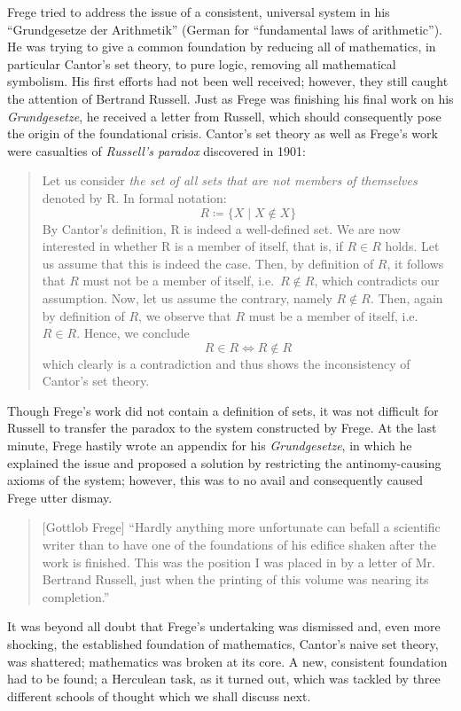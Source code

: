 \documentclass[hidelinks]{article}
\begin{document}
Frege tried to address the issue of a consistent, universal system in his ``Grundgesetze der Arithmetik'' (German for ``fundamental laws of arithmetic''). He was trying to give a common foundation by reducing all of mathematics, in particular Cantor's set theory, to pure logic, removing all mathematical symbolism. His first efforts had not been well received; however, they still caught the attention of Bertrand Russell. Just as Frege was finishing his final work on his \textit{Grundgesetze}, he received a letter from Russell, which should consequently pose the origin of the foundational crisis. Cantor's set theory as well as Frege's work were casualties of \textit{Russell's paradox} discovered in 1901:
\begin{quote}
Let us consider \textit{the set of all sets that are not members of themselves} denoted by R. In formal notation:
\begin{equation*}
	R\coloneqq\{X\mid X\notin X\}
\end{equation*}
By Cantor's definition, R is indeed a well-defined set.
We are now interested in whether R is a member of itself, that is, if $R\in R$ holds.
Let us assume that this is indeed the case. Then, by definition of $R$, it follows that $R$ must not be a member of itself, i.e.\ $R\notin R$, which contradicts our assumption. Now, let us assume the contrary, namely $R\notin R$. Then, again by definition of $R$, we observe that $R$ must be a member of itself, i.e.\ $R\in R$. Hence, we conclude
\begin{equation*}
		R\in R\iff R\notin R
\end{equation*}
which clearly is a contradiction and thus shows the inconsistency of Cantor's set theory.
\end{quote}
Though Frege's work did not contain a definition of sets, it was not difficult for Russell to transfer the paradox to the system constructed by Frege. At the last minute, Frege hastily wrote an appendix for his \textit{Grundgesetze}, in which he explained the issue and proposed a solution by restricting the antinomy-causing axioms of the system; however, this was to no avail and consequently caused Frege utter dismay.
\begin{quote}[Gottlob Frege]
``Hardly anything more unfortunate can befall a scientific writer than to have one of the foundations of his edifice shaken after the work is finished. This was the position I was placed in by a letter of Mr. Bertrand Russell, just when the printing of this volume was nearing its completion.''\cite{frege_appendix}
\end{quote}
It was beyond all doubt that Frege's undertaking was dismissed and, even more shocking, the established foundation of mathematics, Cantor's naive set theory, was shattered; mathematics was broken at its core. A new, consistent foundation had to be found; a Herculean task, as it turned out, which was tackled by three different schools of thought which we shall discuss next.
\end{document}
